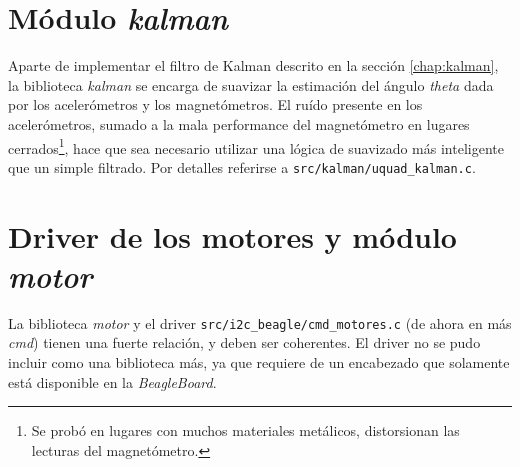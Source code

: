 \documentclass[main]{subfiles}
\begin{document}
\section{M\'odulo \textit{kalman}}
\label{sec:software:kalman}

Aparte de implementar el filtro de Kalman descrito en la secci\'on \ref{chap:kalman}, la biblioteca \textit{kalman} se encarga de suavizar la estimaci\'on del \'angulo \textit{theta} dada por los aceler\'ometros y los magnet\'ometros. El ru\'ido presente en los aceler\'ometros, sumado a la mala performance del magnet\'ometro en lugares cerrados\footnote{Se prob\'o en lugares con muchos materiales met\'alicos, distorsionan las lecturas del magnet\'ometro.}, hace que sea necesario utilizar una l\'ogica de suavizado m\'as inteligente que un simple filtrado. Por detalles referirse a \verb+src/kalman/uquad_kalman.c+.

\section{Driver de los motores y m\'odulo \textit{motor}}
\label{sec:software:cmd-motor}

La biblioteca \textit{motor} y el driver \verb+src/i2c_beagle/cmd_motores.c+ (de ahora en m\'as \textit{cmd}) tienen una fuerte relaci\'on, y deben ser coherentes. El driver no se pudo incluir como una biblioteca m\'as, ya que requiere de un encabezado que solamente est\'a disponible en la \textit{BeagleBoard}.
\end{document}
